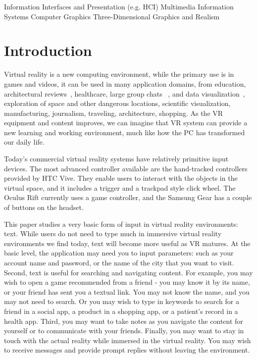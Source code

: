\documentclass{sigchi}
\def\plainkeywords{virtual reality; text input; text entry; multimodal.}
\begin{document}
{Information Interfaces and Presentation (e.g. HCI)}
{Multimedia Information Systems}
{Computer Graphics}
{Three-Dimensional Graphics and Realism}


\keywords{\plainkeywords}


\section{Introduction}

Virtual reality is a new computing environment, while the primary use is in games and videos, it can be used in many application domains, from education, architectural reviews~\cite{guerreiro2014beyond}, healthcare, large group chats ~\cite{mcnerney1999system}, and data visualization~\cite{abbott2011empire}, exploration of space and other dangerous locations, scientific visualization, manufacturing, journalism, traveling, architecture, shopping.
As the VR equipment and content improves, we can imagine that VR system can provide a new learning and working environment, much like how the PC has transformed our daily life.

Today's commercial virtual reality systems have relatively primitive input devices.
The most advanced controller available are the hand-tracked controllers provided by HTC Vive.
They enable users to interact with the objects in the virtual space, and it includes a trigger and a trackpad style click wheel.
The Oculus Rift currently uses a game controller, and the Samsung Gear has a couple of buttons on the headset.

This paper studies a very basic form of input in virtual reality environments: text.
While users do not need to type much in immersive virtual reality environments we find today, text will become more useful as VR matures.
At the basic level, the application may need you to input parameters: such as your account name and password, or the name of the city that you want to visit.
Second, text is useful for searching and navigating content.
For example, you may wish to open a game recommended from a friend - you may know it by its name, or your friend has sent you a textual link.
You may not know the name, and you may not need to search.
Or you may wish to type in keywords to search for a friend in a social app, a product in a shopping app, or a patient’s record in a health app.
Third, you may want to take notes as you navigate the content for yourself or to communicate with your friends.
Finally, you may want to stay in touch with the actual reality while immersed in the virtual reality.
You may wish to receive messages and provide prompt replies without leaving the environment.
\end{document}
